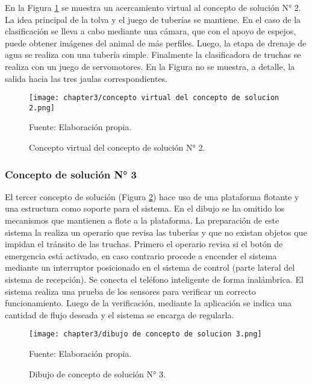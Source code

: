 En la Figura \ref{fig:concepto virtual del concepto de solucion 2} se muestra un acercamiento virtual al concepto de solución N° 2. La idea principal de la tolva y el juego de tuberías se mantiene. En el caso de la clasificación se lleva a cabo mediante una cámara, que con el apoyo de espejos, puede obtener imágenes del animal de más perfiles. Luego, la etapa de drenaje de agua se realiza con una tubería simple. Finalmente la clasificadora de truchas se realiza con un juego de servomotores. En la Figura no se muestra, a detalle, la salida hacia las tres jaulas correspondientes.

\begin{figure}[H]
	\centering
	\texttt{[image: chapter3/concepto virtual del concepto de solucion 2.png]}
	\caption{Concepto virtual del concepto de solución N° 2.}
	\begin{myflushleftportland}
		Fuente: Elaboración propia.
	\end{myflushleftportland}
	\label{fig:concepto virtual del concepto de solucion 2}
\end{figure}

\subsubsection{Concepto de solución N° 3}

El tercer concepto de solución (Figura \ref{fig:dibujo de concepto de solucion 3}) hace uso de una plataforma flotante y una estructura como soporte para el sistema. En el dibujo se ha omitido los mecanismos que mantienen a flote a la plataforma. La preparación de este sistema la realiza un operario que revisa las tuberías y que no existan objetos que impidan el tránsito de las truchas. Primero el operario revisa si el botón de emergencia está activado, en caso contrario procede a encender el sistema mediante un interruptor posicionado en el sistema de control (parte lateral del sistema de recepción). Se conecta el teléfono inteligente de forma inalámbrica. El sistema realiza una prueba de los sensores para verificar un correcto funcionamiento. Luego de la verificación, mediante la aplicación se indica una cantidad de flujo deseada y el sistema se encarga de regularla.

\begin{figure}[H]
	\centering
	\texttt{[image: chapter3/dibujo de concepto de solucion 3.png]}
	\caption{Dibujo de concepto de solución N° 3.}
	\begin{myflushleftportland}
		Fuente: Elaboración propia.
	\end{myflushleftportland}
	\label{fig:dibujo de concepto de solucion 3}
\end{figure}

